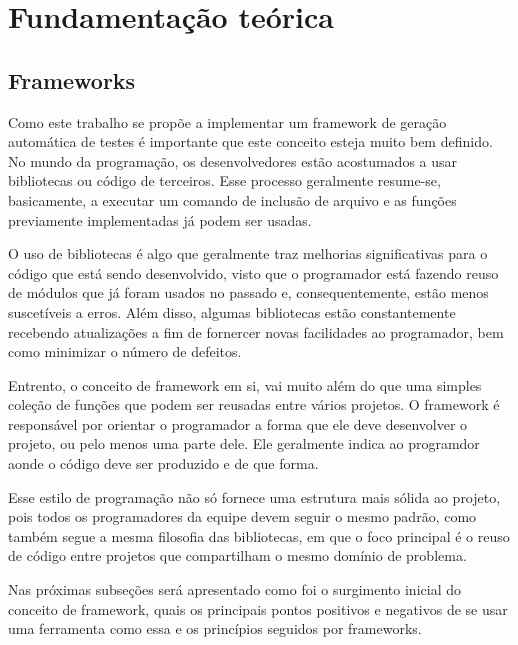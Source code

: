 \documentclass[
    12pt,       %
    openright,      %
    twoside,      %
    a4paper,      %
    english,      %
    french,       %
    spanish,      %
    brazil,       %
    ]{abntex2}
\begin{document}
  

  \part{Fundamentação teórica}

  \chapter{Frameworks}

      Como este trabalho se propõe a implementar um framework de geração
      automática de testes é importante que este conceito esteja muito bem
      definido. No mundo da programação, os desenvolvedores estão
      acostumados a usar bibliotecas ou código de terceiros. Esse processo
      geralmente resume-se, basicamente, a executar um comando de inclusão
      de arquivo e as funções previamente implementadas já podem ser usadas.

      O uso de bibliotecas é algo que geralmente traz melhorias significativas
      para o código que está sendo desenvolvido, visto que o programador
      está fazendo reuso de módulos que já foram usados no passado e,
      consequentemente, estão menos suscetíveis a erros. Além
      disso, algumas bibliotecas estão constantemente recebendo atualizações
      a fim de fornercer novas facilidades ao programador, bem como minimizar
      o número de defeitos.

      Entrento, o conceito de framework em si, vai muito além do que uma
      simples coleção de funções que podem ser reusadas entre vários
      projetos. O framework é responsável por orientar o programador
      a forma que ele deve desenvolver o projeto, ou pelo menos uma parte dele.
      Ele geralmente indica ao programdor aonde o código deve ser
      produzido e de que forma.

      Esse estilo de programação não só fornece uma estrutura mais sólida
      ao projeto, pois todos os programadores da equipe devem seguir o mesmo
      padrão, como também segue a mesma filosofia das bibliotecas, em que o
      foco principal é o reuso de código entre projetos que compartilham
      o mesmo domínio de problema.

      Nas próximas subseções será apresentado como foi o surgimento inicial
      do conceito de framework, quais os principais pontos positivos e
      negativos de se usar uma ferramenta como essa e os princípios
      seguidos por frameworks.
\end{document}
